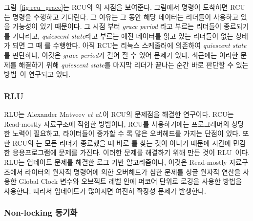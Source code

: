 그림~\ref{fig:rcu_grace}는 RCU의 의 시점을 보여준다.
그림에서  명령이 도착하면  RCU는  명령을 수행하고 기다린다.  
그 이유는 그 동안 해당 데이터는 리더들이 사용하고 있을 가능성이 있기 때문이다.
그 시점 부터 \textit{grace period} 라고 부르는 리더들이 종료되기를 기다리고, \textit{quiescent
state}라고 부르는 예전 데이터를 읽고 있는 리더들이 없는 상태가 되면 그 때 를 수행한다. 
아직 RCU는 리눅스 스케줄러에 의존하여 \textit{quiescent state}를 판단하나, 
이것은 \textit{grace period}가 길어 질 수 있어 문제가 있다. 
최근에는 이러한 문제를 해결하기 위해 \textit{quiescent state}를 마지막 리더가 끝나는 순간 바로 판단할 
수 있는 방법~\cite{Arbel2015PRR}이 연구되고 있다.

\subsubsection{RLU}

RLU는 Alexander Matveev \textit{et al.}이 RCU의 문제점을 해결한 연구이다. 
RCU는 Read-mostly 자료구조에 적합한 방법이나, RCU를 사용하기에는 프로그래머의 상당한 노력이 
필요하고, 라이터들이 증가할 수 록 많은 오버헤드를 가지는 단점이 있다.
또한 RCU의 는 모든 리더가 종료했을 때 바로 를 찾는 것이 아니기
때문에 시간에 민감한 응용프로그램에 문제를 가진다. 
이러한 문제를 해결하기 위해 만든 것이 RLU~\cite{Matveev2015RLU}이다. 
RLU는 업데이트 문제를 해결한 로그 기반 알고리즘이나, 
이것은 Read-mostly 자료구조에서 라이터의 원자적 명령어에 의한 오버헤드가 심한 문제를 
싱글 원자적 연산을 사용한 Global Clock 변수와 오브젝트 레벨 안에 퍼코어 단위로 로깅을 사용한 방법을 사용한다.
따라서 업데이트가 많아지면 여전히 확장성 문제가 발생한다. 

\subsubsection{Non-locking 동기화}

